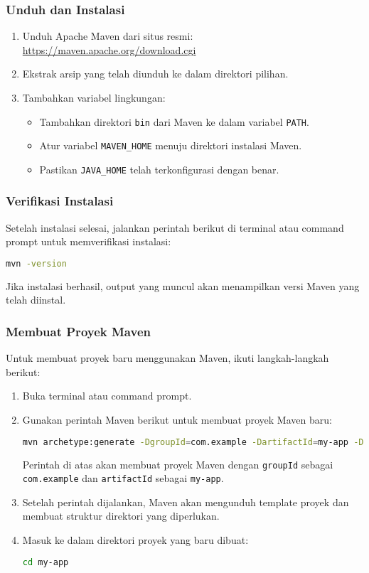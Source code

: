 \subsubsection{Unduh dan Instalasi}
\begin{enumerate}
	\item Unduh Apache Maven dari situs resmi: \url{https://maven.apache.org/download.cgi}
	\item Ekstrak arsip yang telah diunduh ke dalam direktori pilihan.
	\item Tambahkan variabel lingkungan:
	\begin{itemize}
		\item Tambahkan direktori \texttt{bin} dari Maven ke dalam variabel \texttt{PATH}.
		\item Atur variabel \texttt{MAVEN\_HOME} menuju direktori instalasi Maven.
		\item Pastikan \texttt{JAVA\_HOME} telah terkonfigurasi dengan benar.
	\end{itemize}
\end{enumerate}

\subsubsection{Verifikasi Instalasi}
Setelah instalasi selesai, jalankan perintah berikut di terminal atau command prompt untuk memverifikasi instalasi:

\begin{lstlisting}[language=bash]
	mvn -version
\end{lstlisting}

Jika instalasi berhasil, output yang muncul akan menampilkan versi Maven yang telah diinstal.

\subsubsection{Membuat Proyek Maven}
Untuk membuat proyek baru menggunakan Maven, ikuti langkah-langkah berikut:

\begin{enumerate}
	\item Buka terminal atau command prompt.
	\item Gunakan perintah Maven berikut untuk membuat proyek Maven baru:
	\begin{lstlisting}[language=bash]
		mvn archetype:generate -DgroupId=com.example -DartifactId=my-app -DarchetypeArtifactId=maven-archetype-quickstart -DinteractiveMode=false
	\end{lstlisting}
	Perintah di atas akan membuat proyek Maven dengan \texttt{groupId} sebagai \texttt{com.example} dan \texttt{artifactId} sebagai \texttt{my-app}.
	\item Setelah perintah dijalankan, Maven akan mengunduh template proyek dan membuat struktur direktori yang diperlukan.
	\item Masuk ke dalam direktori proyek yang baru dibuat:
	\begin{lstlisting}[language=bash]
		cd my-app
	\end{lstlisting}
\end{enumerate}


